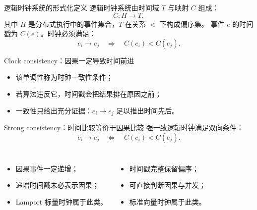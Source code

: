 \documentclass[UTF8,fontset=none,aspectratio=169,10pt]{beamer}
\begin{document}
\begin{frame}{逻辑时钟系统的形式化定义}
逻辑时钟系统由时间域 $T$ 与映射 $C$ 组成：
\[
C:H\rightarrow T,
\]
其中 $H$ 是分布式执行中的事件集合，$T$ 在关系 $<$ 下构成偏序集。
\vfill
事件 $e$ 的时间戳为 $C(e)$。时钟必须满足：
\[
e_i\rightarrow e_j\quad\Longrightarrow\quad C(e_i)<C(e_j).
\]
\vfill
{}
\end{frame}

\begin{frame}{Clock consistency：因果一定导致时间前进}
\begin{center}
\end{center}
\vfill
\begin{itemize}
  \item 该单调性称为时钟一致性条件；
  \item 若算法违反它，时间戳会把结果排在原因之前；
  \item 一致性只给出充分证据：$e_i\rightarrow e_j$ 足以推出时间先后。
\end{itemize}
\end{frame}

\begin{frame}{Strong consistency：时间比较等价于因果比较}
强一致逻辑时钟满足双向条件：
\[
e_i\rightarrow e_j
\quad\Longleftrightarrow\quad
C(e_i)<C(e_j).
\]
\vfill
\begin{columns}[T,onlytextwidth]
\begin{itemize}
  \item 因果事件一定递增；
  \item 递增时间戳未必表示因果；
  \item Lamport 标量时钟属于此类。
\end{itemize}
\begin{itemize}
  \item 时间戳完整保留偏序；
  \item 可直接判断因果与并发；
  \item 标准向量时钟属于此类。
\end{itemize}
\end{columns}
\end{frame}
\end{document}
